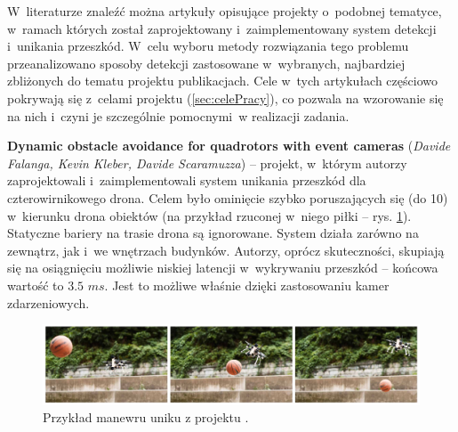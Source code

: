 
W~literaturze znaleźć można artykuły opisujące projekty o~podobnej tematyce, w~ramach których został zaprojektowany i~zaimplementowany system detekcji i~unikania przeszkód. W~celu wyboru metody rozwiązania tego problemu przeanalizowano sposoby detekcji zastosowane w~wybranych, najbardziej zbliżonych do tematu projektu publikacjach. Cele w~tych artykułach częściowo pokrywają się z~celami projektu (\ref{sec:celePracy}), co pozwala na wzorowanie się na nich i~czyni je szczególnie pomocnymi~w realizacji zadania. 

\textbf{Dynamic obstacle avoidance for quadrotors with event cameras} (\textit{Davide Falanga, Kevin Kleber, Davide Scaramuzza}) \cite{dynamic_obstacle} -- projekt, w~którym autorzy zaprojektowali i~zaimplementowali system unikania przeszkód dla czterowirnikowego drona. Celem było ominięcie szybko poruszających się (do \SI{10}{}) w~kierunku drona obiektów (na przykład rzuconej w~niego piłki -- rys. \ref{fig:dynamic_obstacle}). Statyczne bariery na trasie drona są ignorowane. System działa zarówno na zewnątrz, jak i~we wnętrzach budynków. Autorzy, oprócz skuteczności, skupiają się na osiągnięciu możliwie niskiej latencji w~wykrywaniu przeszkód -- końcowa wartość to $3.5$ $ms$. Jest to możliwe właśnie dzięki zastosowaniu kamer zdarzeniowych.

\begin{figure}
    \centering
    \includegraphics[width=0.8\linewidth]{images/dyanimc_obstacle.png}
    \caption{Przykład manewru uniku z projektu \cite{dynamic_obstacle}.}
    \label{fig:dynamic_obstacle}
\end{figure}

